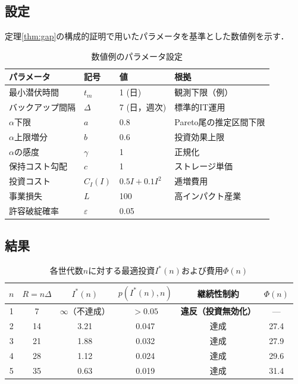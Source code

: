 \documentclass[12pt,a4paper]{article}
\theoremstyle{plain}
\theoremstyle{definition}
\theoremstyle{remark}
\begin{document}
\subsection{設定}

定理\ref{thm:gap}の構成的証明で用いたパラメータを基準とした数値例を示す．

\begin{table}[h]
\centering
\caption{数値例のパラメータ設定}
\label{tab:params}
\begin{tabular}{@{}llll@{}}
\toprule
パラメータ & 記号 & 値 & 根拠 \\
\midrule
最小潜伏時間 & $t_m$ & 1 (日) & 観測下限（例）\\
バックアップ間隔 & $\Delta$ & 7 (日，週次) & 標準的IT運用 \\
$\alpha$下限 & $a$ & 0.8 & Pareto尾の推定区間下限 \\
$\alpha$上限増分 & $b$ & 0.6 & 投資効果上限 \\
$\alpha$の感度 & $\gamma$ & 1 & 正規化 \\
保持コスト勾配 & $c$ & 1 & ストレージ単価 \\
投資コスト & $C_I(I)$ & $0.5I+0.1I^2$ & 逓増費用 \\
事業損失 & $L$ & 100 & 高インパクト産業 \\
許容破綻確率 & $\varepsilon$ & 0.05 & \\
\bottomrule
\end{tabular}
\end{table}

\subsection{結果}

\begin{table}[h]
\centering
\caption{各世代数$n$に対する最適投資$I^*(n)$および費用$\Phi(n)$}
\label{tab:results}
\begin{tabular}{@{}cccccc@{}}
\toprule
$n$ & $R=n\Delta$ & $I^*(n)$ & $p(I^*(n),n)$ & 継続性制約 & $\Phi(n)$ \\
\midrule
1 & 7  & $\infty$（不達成） & $> 0.05$ & \textbf{違反（投資無効化）} & --- \\
2 & 14 & 3.21 & 0.047 & 達成 & 27.4 \\
3 & 21 & 1.88 & 0.032 & 達成 & 27.9 \\
4 & 28 & 1.12 & 0.024 & 達成 & 29.6 \\
5 & 35 & 0.63 & 0.019 & 達成 & 31.4 \\
\bottomrule
\end{tabular}
\end{table}
\end{document}
